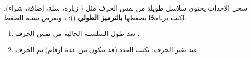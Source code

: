 \begin{statement}
سجل الأحداث يحتوي سلاسل طويلة من نفس الحرف مثل  ( زيارة،  سلة،  إضافة،  شراء). اكتب برنامجًا يضغطها \textbf{بالترميز الطولي} (): ، ويعرض نسبة الضغط.
\end{statement}
\begin{stepsbox}\begin{enumerate}
\item نعد طول السلسلة الحالية من نفس الحرف .
\item عند تغير الحرف: نكتب العدد (قد يتكون من عدة أرقام) ثم الحرف.
\end{enumerate}\end{stepsbox}
